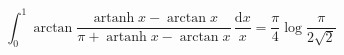 %

\begin{problem}[pytanie 464769]
    \label{stack_464769}%
    \begin{equation}
        \int_0^1 \arctan \frac { \operatorname{artanh} x - \arctan x} {\pi + \operatorname{artanh} x - \arctan x}  \, \frac{\mathrm{d}x}{x} = \frac \pi 4 \log \frac{\pi}{2 \sqrt{2}}
    \end{equation}
\end{problem}

%